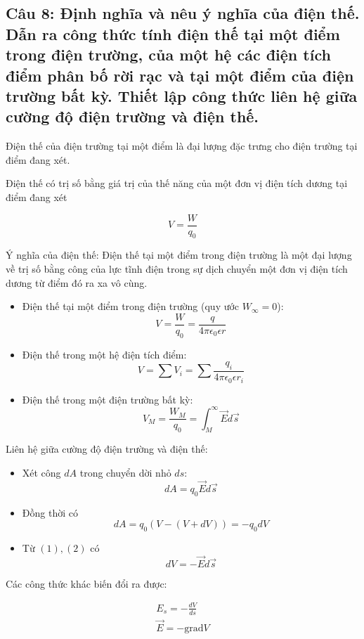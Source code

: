 \subsection[Câu 8]{Câu 8: Định nghĩa và nêu ý nghĩa của điện thế. Dẫn ra công thức tính điện thế tại một điểm trong điện trường, của một hệ các điện tích điểm phân bố rời rạc và tại một điểm của điện trường bất kỳ. Thiết lập công thức liên hệ giữa cường độ điện trường và điện thế.}

Điện thế của điện trường tại một điểm là đại lượng đặc trưng cho điện trường tại điểm đang xét.

Điện thế có trị số bằng giá trị của thế năng của một đơn vị điện tích dương tại điểm đang xét 

\begin{equation*}
V = \frac{W}{q_0}
\end{equation*}

Ý nghĩa của điện thế: Điện thế tại một điểm trong điện trường là một đại lượng về trị số bằng công của lực tĩnh điện trong sự dịch chuyển một đơn vị điện tích dương từ điểm đó ra xa vô cùng.

\begin{itemize}
  \item Điện thế tại một điểm trong điện trường (quy ước $W_\infty = 0$): 
  \begin{equation*}
    V = \frac{W}{q_0} = \frac{q}{4\pi\epsilon_0\epsilon r}
  \end{equation*}
  \item Điện thế trong một hệ điện tích điểm:
  \begin{equation*}
    V = \sum V_i = \sum \frac{q_i}{4\pi\epsilon_0\epsilon r_i}
  \end{equation*}
  \item Điện thế trong một điện trường bất kỳ:
  \begin{equation*}
    V_M = \frac{W_M}{q_0} = \int_{M}^{\infty} \vec{E}d\vec{s}
  \end{equation*}
\end{itemize}

Liên hệ giữa cường độ điện trường và điện thế:

\begin{itemize}
  \item Xét công $dA$ trong chuyển dời nhỏ $ds$:
  \begin{equation}\tag{$1$}
    dA = q_0 \vec{E}d\vec{s}
  \end{equation}
  \item Đồng thời có
  \begin{equation}\tag{$2$}
    dA = q_0 (V - (V + dV)) = -q_0dV
  \end{equation}
  \item Từ $(1), (2)$ có 
  \begin{equation*}
    dV = -\vec{E}d\vec{s}
  \end{equation*}
\end{itemize}

Các công thức khác biến đổi ra được:

\begin{gather*}
  E_s = -\frac{dV}{ds} \\
  \vec{E} = -\text{grad}V
\end{gather*}